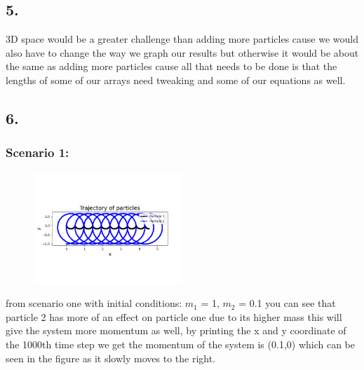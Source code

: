 \documentclass{article}
\begin{document}
        \subsection*{5.}
        3D space would be a greater challenge than adding more particles cause we would also have to change the way we graph our results
        but otherwise it would be about the same as adding more particles cause all that needs to be done is that the lengths of some of our arrays need tweaking
        and some of our equations as well.
        \subsection*{6.}
            \subsubsection*{Scenario 1:}
            \begin{figure}[h]  %
                \centering
                \includegraphics[width=0.5\textwidth]{Scenario_1.png}  %
                \label{fig:Scenario 1}
            \end{figure} 
            from scenario one with initial conditions: $m_1$ = 1, $m_2$ = 0.1  you can see that particle 2 has more of an effect on particle one due to its higher mass
            this will give the system more momentum as well, by printing the x and y coordinate of the 1000th time step we get the 
            momentum of the system is (0.1,0) which can be seen in the figure as it slowly moves to the right.
            
\end{document}
